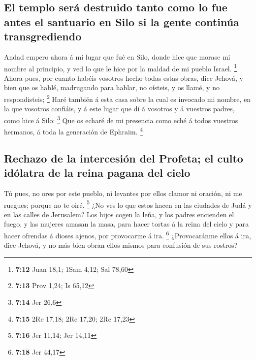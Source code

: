 \hypertarget{el-templo-seruxe1-destruido-tanto-como-lo-fue-antes-el-santuario-en-silo-si-la-gente-continuxfaa-transgrediendo}{%
\subsection{El templo será destruido tanto como lo fue antes el
santuario en Silo si la gente continúa
transgrediendo}\label{el-templo-seruxe1-destruido-tanto-como-lo-fue-antes-el-santuario-en-silo-si-la-gente-continuxfaa-transgrediendo}}

 Andad empero ahora á mi lugar que fué en Silo, donde hice
que morase mi nombre al principio, y ved lo que le hice por la maldad de
mi pueblo Israel. \footnote{\textbf{7:12} Juan 18,1; 1Sam 4,12; Sal
  78,60}  Ahora pues, por cuanto habéis vosotros hecho
todas estas obras, dice Jehová, y bien que os hablé, madrugando para
hablar, no oísteis, y os llamé, y no respondisteis; \footnote{\textbf{7:13}
  Prov 1,24; Is 65,12}  Haré también á esta casa sobre la
cual es invocado mi nombre, en la que vosotros confiáis, y á este lugar
que dí á vosotros y á vuestros padres, como hice á Silo: \footnote{\textbf{7:14}
  Jer 26,6}  Que os echaré de mi presencia como eché á
todos vuestros hermanos, á toda la generación de Ephraim. \footnote{\textbf{7:15}
  2Re 17,18; 2Re 17,20; 2Re 17,23}

\hypertarget{rechazo-de-la-intercesiuxf3n-del-profeta-el-culto-iduxf3latra-de-la-reina-pagana-del-cielo}{%
\subsection{Rechazo de la intercesión del Profeta; el culto idólatra de
la reina pagana del
cielo}\label{rechazo-de-la-intercesiuxf3n-del-profeta-el-culto-iduxf3latra-de-la-reina-pagana-del-cielo}}

 Tú pues, no ores por este pueblo, ni levantes por ellos
clamor ni oración, ni me ruegues; porque no te oiré. \footnote{\textbf{7:16}
  Jer 11,14; Jer 14,11}  ¿No ves lo que estos hacen en las
ciudades de Judá y en las calles de Jerusalem?  Los hijos
cogen la leña, y los padres encienden el fuego, y las mujeres amasan la
masa, para hacer tortas á la reina del cielo y para hacer ofrendas á
dioses ajenos, por provocarme á ira. \footnote{\textbf{7:18} Jer 44,17}
 ¿Provocaránme ellos á ira, dice Jehová, y no más bien
obran ellos mismos para confusión de sus rostros?

